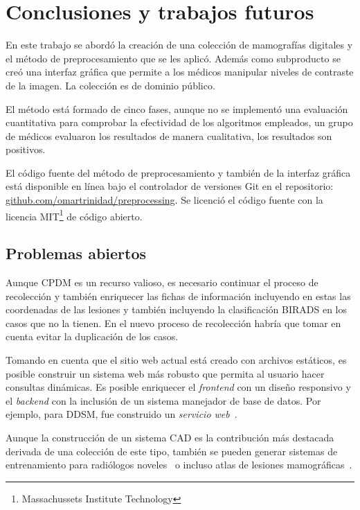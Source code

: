 \chapter{Conclusiones y trabajos futuros}
\label{conclusiones}

En este trabajo se abordó la creación de una colección de mamografías digitales
y el método de preprocesamiento que se les aplicó. Además como subproducto se
creó una interfaz gráfica que permite a los médicos manipular niveles de
contraste de la imagen. La colección es de dominio público. 

El método está formado de cinco fases, aunque no se implementó una evaluación
cuantitativa para comprobar la efectividad de los algoritmos empleados, un
grupo de médicos evaluaron los resultados de manera cualitativa, los resultados
son positivos.

El código fuente del método de preprocesamiento y también de la interfaz
gráfica está disponible en línea bajo el controlador de versiones Git en el
repositorio: \url{github.com/omartrinidad/preprocessing}. Se licenció el código
fuente con la licencia MIT\footnote{Massachussets Institute Technology} de
código abierto.

\section{Problemas abiertos}

Aunque CPDM es un recurso valioso, es necesario continuar el proceso de
recolección y también enriquecer las fichas de información incluyendo en estas
las coordenadas de las lesiones y también incluyendo la clasificación BIRADS en
los casos que no la tienen. En el nuevo proceso de recolección habría que tomar
en cuenta evitar la duplicación de los casos.

Tomando en cuenta que el sitio web actual está creado con archivos estáticos,
es posible construir un sistema web más robusto que permita al usuario hacer
consultas dinámicas. Es posible enriquecer el \textit{frontend} con un diseño
responsivo y el \textit{backend} con la inclusión de un sistema manejador de
base de datos. Por ejemplo, para DDSM, fue construido un \textit{servicio
web}~\cite{rose2006web}. 

Aunque la construcción de un sistema CAD es la contribución más destacada
derivada de una colección de este tipo, también se pueden generar sistemas de
entrenamiento para radiólogos noveles~\cite{suri2006recent} o incluso atlas de
lesiones mamográficas~\cite{antoniou2009web}.

